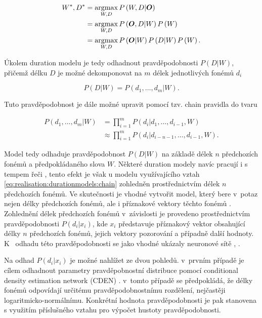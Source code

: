 \begin{align}
  W^{*}, D^{*} &= \operatorname*{argmax}_{W, D} P\left(W, D| \boldsymbol{O}\right) \nonumber  \\
          &= \operatorname*{argmax}_{W, D} P\left(\boldsymbol{O}, D| W\right)P\left(W\right) \nonumber  \\
          &= \operatorname*{argmax}_{W, D} P\left(\boldsymbol{O}|W\right)P\left(D|W\right)P\left(W\right).
  \label{eq:realisation:durationmodels:assumtion}
\end{align}

\noindent Úkolem duration modelu je tedy odhadnout pravděpodobnosti $P\left(D|W\right)$, přičemž délku $D$ je možné dekomponovat na $m$ délek jednotlivých fonémů $d_{i}$

\begin{equation}
  P\left(D | W\right) = P\left(d_{1}, \dots, d_{m}|W\right).
  \label{eq:realisation:durationmodels:decomposition}
\end{equation}

\noindent Tuto pravděpodobnost je dále možné upravit pomocí tzv. chain pravidla do tvaru

\begin{align}
  P\left(d_{1}, \dots, d_{m} | W\right) &= \prod_{i=1}^{m} P\left(d_{i} | d_{1}, \dots, d_{i-1}, W\right) \nonumber \\
        &\approx \prod_{i=1}^{m} P\left(d_{i} | d_{i-n-1}, \dots, d_{i-1}, W\right).
  \label{eq:realisation:durationmodels:chain}
\end{align}

\noindent Model tedy odhaduje pravděpodobnost $P\left(D|W\right)$ na základě délek $n$ předchozích fonémů a předpokládaného slova $W$. Některé duration modely navíc pracují i s tempem řeči \cite{Pylkkonen2004}, tento efekt je však u modelu využívajícího vztah \ref{eq:realisation:durationmodels:chain} zohledněn prostřednictvím délek $n$ předchozích fonémů. Ve skutečnosti je vhodné vytvořit model, který bere v~potaz nejen délky předchozích fonémů, ale i příznakové vektory těchto fonémů \cite{Alumae2014}. Zohlednění délek předchozích fonémů v~závislosti je provedeno prostřednictvím pravděpodobnosti  $P\left(d_{i}|x_{i}\right)$, kde $x_{i}$ představuje příznakový vektor obsahující délky $n$ předchozích fonémů, jejich vektory pozorování a případně další hodnoty. K~ odhadu této pravděpodobnosti se jako vhodné ukázaly neuronové sítě \cite{Alumae2014}, \cite{Hadian2017}.

Na odhad $P\left(d_{i}|x_{i}\right)$ je možné nahlížet ze dvou pohledů. v~prvním případě je cílem odhadnout parametry pravděpobnostní distribuce pomocí conditional density estimation network (CDEN) \cite{Alumae2014}. v~tomto případě se předpokládá, že délky fonémů odpovídají určitému pravděpodobnostnímu rozdělení, nejčastěji logaritmicko-normálnímu. Konkrétní hodnota pravděpodobnosti je pak stanovena s využitím příslušného vztahu pro výpočet hustoty pravděpodobnosti.

